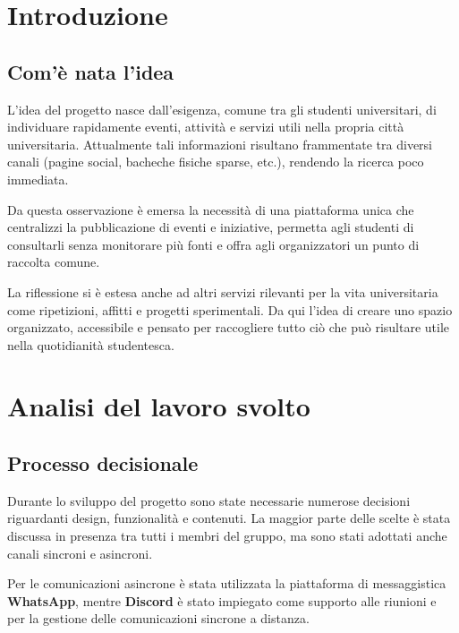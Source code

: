 \documentclass[a4paper,12pt]{article}
\begin{document}
\begin{titlepage}
\begin{tabular}{r|l}
        \end{tabular}

        \vfill

    \end{titlepage}     
    \newpage
    \tableofcontents
    \newpage
\clearpage 
{}
\section{Introduzione}

\subsection{Com'è nata l’idea}
L’idea del progetto nasce dall’esigenza, comune tra gli studenti universitari, di individuare rapidamente eventi, attività e servizi utili nella propria città universitaria. Attualmente tali informazioni risultano frammentate tra diversi canali (pagine social, bacheche fisiche sparse, etc.), rendendo la ricerca poco immediata.

Da questa osservazione è emersa la necessità di una piattaforma unica che centralizzi la pubblicazione di eventi e iniziative, permetta agli studenti di consultarli senza monitorare più fonti e offra agli organizzatori un punto di raccolta comune.

La riflessione si è estesa anche ad altri servizi rilevanti per la vita universitaria come ripetizioni, affitti e progetti sperimentali. Da qui l’idea di creare uno spazio organizzato, accessibile e pensato per raccogliere tutto ciò che può risultare utile nella quotidianità studentesca.

\section{Analisi del lavoro svolto}

\subsection{Processo decisionale}
Durante lo sviluppo del progetto sono state necessarie numerose decisioni riguardanti design, funzionalità e contenuti. La maggior parte delle scelte è stata discussa in presenza tra tutti i membri del gruppo, ma sono stati adottati anche canali sincroni e asincroni.

Per le comunicazioni asincrone è stata utilizzata la piattaforma di messaggistica 
\textbf{WhatsApp}, mentre 
\textbf{Discord} è stato impiegato come supporto alle riunioni e per la gestione delle comunicazioni sincrone a distanza.
\end{document}
